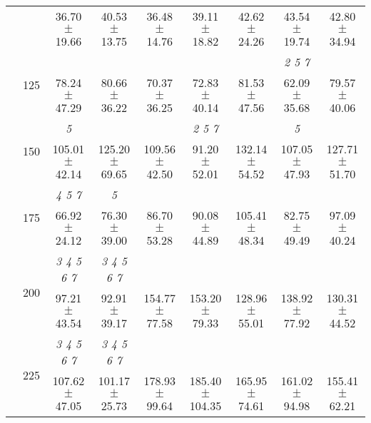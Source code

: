 \begin{table}[h]
{\begin{tabular}{
        ccccccccc}
 & & 36.70 $\pm$ 19.66& 40.53 $\pm$ 13.75& 36.48 $\pm$ 14.76& 39.11 $\pm$ 18.82& 42.62 $\pm$ 24.26& 43.54 $\pm$ 19.74& 42.80 $\pm$ 34.94 \\ 
 & \multirow{2}{*}{125}& \cellcolor[HTML]{EFEFEF} & \cellcolor[HTML]{EFEFEF} & \cellcolor[HTML]{EFEFEF} & \cellcolor[HTML]{EFEFEF} & \cellcolor[HTML]{EFEFEF} & \cellcolor[HTML]{EFEFEF} \textit{ 2 5 7 }& \cellcolor[HTML]{EFEFEF}  \\ 
 & & \cellcolor[HTML]{EFEFEF} 78.24 $\pm$ 47.29& \cellcolor[HTML]{EFEFEF} 80.66 $\pm$ 36.22& \cellcolor[HTML]{EFEFEF} 70.37 $\pm$ 36.25& \cellcolor[HTML]{EFEFEF} 72.83 $\pm$ 40.14& \cellcolor[HTML]{EFEFEF} 81.53 $\pm$ 47.56& \cellcolor[HTML]{EFEFEF} 62.09 $\pm$ 35.68& \cellcolor[HTML]{EFEFEF} 79.57 $\pm$ 40.06 \\ 
 & \multirow{2}{*}{150}& \textit{ 5 }& & & \textit{ 2 5 7 }& & \textit{ 5 }&  \\ 
 & & 105.01 $\pm$ 42.14& 125.20 $\pm$ 69.65& 109.56 $\pm$ 42.50& 91.20 $\pm$ 52.01& 132.14 $\pm$ 54.52& 107.05 $\pm$ 47.93& 127.71 $\pm$ 51.70 \\ 
 & \multirow{2}{*}{175}& \cellcolor[HTML]{EFEFEF} \textit{ 4 5 7 }& \cellcolor[HTML]{EFEFEF} \textit{ 5 }& \cellcolor[HTML]{EFEFEF} & \cellcolor[HTML]{EFEFEF} & \cellcolor[HTML]{EFEFEF} & \cellcolor[HTML]{EFEFEF} & \cellcolor[HTML]{EFEFEF}  \\ 
 & & \cellcolor[HTML]{EFEFEF} 66.92 $\pm$ 24.12& \cellcolor[HTML]{EFEFEF} 76.30 $\pm$ 39.00& \cellcolor[HTML]{EFEFEF} 86.70 $\pm$ 53.28& \cellcolor[HTML]{EFEFEF} 90.08 $\pm$ 44.89& \cellcolor[HTML]{EFEFEF} 105.41 $\pm$ 48.34& \cellcolor[HTML]{EFEFEF} 82.75 $\pm$ 49.49& \cellcolor[HTML]{EFEFEF} 97.09 $\pm$ 40.24 \\ 
 & \multirow{2}{*}{200}& \textit{ 3 4 5 6 7 }& \textit{ 3 4 5 6 7 }& & & & &  \\ 
 & & 97.21 $\pm$ 43.54& 92.91 $\pm$ 39.17& 154.77 $\pm$ 77.58& 153.20 $\pm$ 79.33& 128.96 $\pm$ 55.01& 138.92 $\pm$ 77.92& 130.31 $\pm$ 44.52 \\ 
 & \multirow{2}{*}{225}& \cellcolor[HTML]{EFEFEF} \textit{ 3 4 5 6 7 }& \cellcolor[HTML]{EFEFEF} \textit{ 3 4 5 6 7 }& \cellcolor[HTML]{EFEFEF} & \cellcolor[HTML]{EFEFEF} & \cellcolor[HTML]{EFEFEF} & \cellcolor[HTML]{EFEFEF} & \cellcolor[HTML]{EFEFEF}  \\ 
 & & \cellcolor[HTML]{EFEFEF} 107.62 $\pm$ 47.05& \cellcolor[HTML]{EFEFEF} 101.17 $\pm$ 25.73& \cellcolor[HTML]{EFEFEF} 178.93 $\pm$ 99.64& \cellcolor[HTML]{EFEFEF} 185.40 $\pm$ 104.35& \cellcolor[HTML]{EFEFEF} 165.95 $\pm$ 74.61& \cellcolor[HTML]{EFEFEF} 161.02 $\pm$ 94.98& \cellcolor[HTML]{EFEFEF} 155.41 $\pm$ 62.21 \\ 

\end{tabular}}
\end{table}
